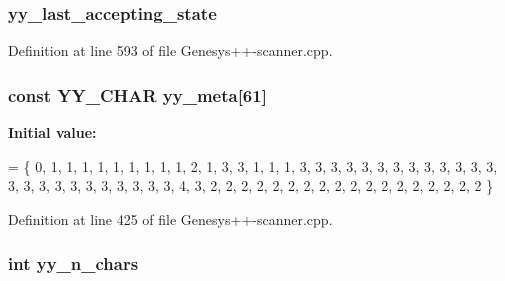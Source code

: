 \hypertarget{_genesys_09_09-scanner_8cpp_a1e8856234732c99be24858b0073e1297}{
\subsubsection[{yy\-\_\-last\-\_\-accepting\-\_\-state}]{ yy\-\_\-last\-\_\-accepting\-\_\-state\hspace{0.3cm}{\ttfamily [static]}}}\label{_genesys_09_09-scanner_8cpp_a1e8856234732c99be24858b0073e1297}


Definition at line 593 of file Genesys++-\/scanner.\-cpp.

\hypertarget{_genesys_09_09-scanner_8cpp_a228a82549c54eabe947c11f136d084b3}{
\subsubsection[{yy\-\_\-meta}]{\setlength{\rightskip}{0pt plus 5cm}const {\bf Y\-Y\-\_\-\-C\-H\-A\-R} yy\-\_\-meta\mbox{[}61\mbox{]}\hspace{0.3cm}{\ttfamily [static]}}}\label{_genesys_09_09-scanner_8cpp_a228a82549c54eabe947c11f136d084b3}
{\bfseries Initial value\-:}
\begin{DoxyCode}
=
    \{   0,
        1,    1,    1,    1,    1,    1,    1,    1,    1,    2,
        1,    3,    3,    1,    1,    1,    3,    3,    3,    3,
        3,    3,    3,    3,    3,    3,    3,    3,    3,    3,
        3,    3,    3,    3,    3,    3,    3,    3,    3,    3,
        4,    3,    2,    2,    2,    2,    2,    2,    2,    2,
        2,    2,    2,    2,    2,    2,    2,    2,    2,    2
    \}
\end{DoxyCode}


Definition at line 425 of file Genesys++-\/scanner.\-cpp.

\hypertarget{_genesys_09_09-scanner_8cpp_aa86c122f2050dbfd365fcf547e6fc1c3}{
\subsubsection[{yy\-\_\-n\-\_\-chars}]{\setlength{\rightskip}{0pt plus 5cm}int yy\-\_\-n\-\_\-chars\hspace{0.3cm}{\ttfamily [static]}}}\label{_genesys_09_09-scanner_8cpp_aa86c122f2050dbfd365fcf547e6fc1c3}


